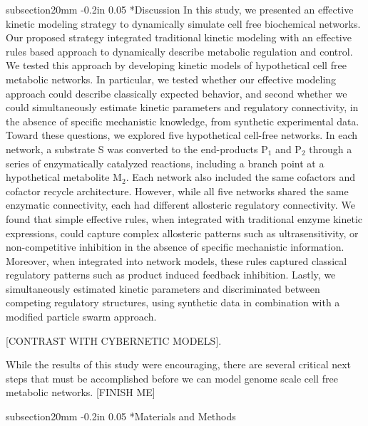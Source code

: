 \documentclass[12pt]{article}
\makeatletter
\renewcommand\section{\@startsection
	{subsection}{2}{0mm}
	{-0.2in}
	{0.05\baselineskip}
	{\normalfont\large\bfseries}}
\makeatother
\begin{document}
\section*{Discussion}
In this study, we presented an effective kinetic modeling strategy to dynamically simulate cell free biochemical networks. 
Our proposed strategy integrated traditional kinetic modeling with an effective rules based approach to dynamically describe metabolic regulation and control.
We tested this approach by developing kinetic models of hypothetical cell free metabolic networks. 
In particular, we tested whether our effective modeling approach could describe classically expected behavior, 
and second whether we could simultaneously estimate kinetic parameters and regulatory connectivity, in the absence of specific mechanistic knowledge, 
from synthetic experimental data. Toward these questions, we explored five hypothetical cell-free networks. In each network, a
substrate S was converted to the end-products P$_{1}$ and P$_{2}$ through a series of enzymatically catalyzed reactions, 
including a branch point at a hypothetical metabolite M$_{2}$. Each network also included the same cofactors and cofactor recycle architecture. 
However, while all five networks shared the same enzymatic connectivity, each had different allosteric regulatory connectivity. 
We found that simple effective rules, when integrated with traditional enzyme kinetic expressions, could
capture complex allosteric patterns such as ultrasensitivity, or non-competitive inhibition in the absence of specific mechanistic information. 
Moreover, when integrated into network models, these rules captured classical regulatory patterns such as product induced feedback inhibition. 
Lastly, we simultaneously estimated kinetic parameters and discriminated between competing regulatory structures, using synthetic data in combination with a
modified particle swarm approach.

[CONTRAST WITH CYBERNETIC MODELS].

While the results of this study were encouraging, there are several critical next steps that must be accomplished before we can model genome scale cell free metabolic networks.
[FINISH ME]

\clearpage

\section*{Materials and Methods}
\end{document}
